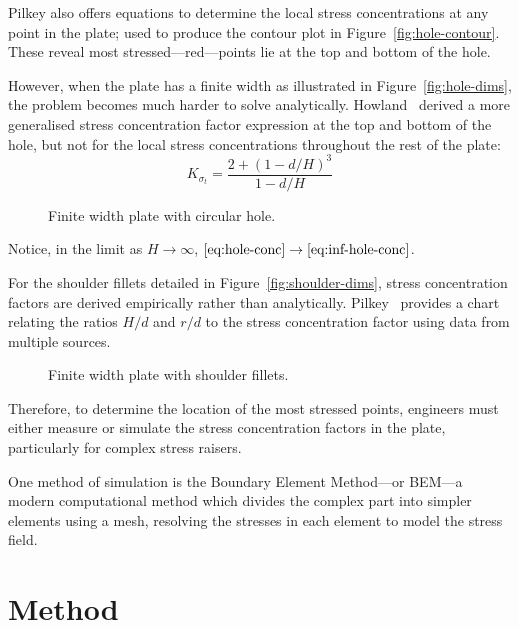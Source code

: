 \documentclass[a4paper,11pt,twocolumn]{article}
\newcommand{\BEM}{\textsc{BEM}\xspace}
\begin{document}
Pilkey also offers equations to determine the local stress concentrations at
any point in the plate; used to produce the contour plot in 
Figure~\ref{fig:hole-contour}. These reveal most stressed---red---points lie
at the top and bottom of the hole.

However, when the plate has a finite width as illustrated in 
Figure~\vref{fig:hole-dims}, the problem becomes much harder to solve
analytically. Howland~\cite{howland1930stresses} derived a more generalised 
stress concentration factor expression at the top and bottom of the hole, but
not for the local stress concentrations throughout the rest of the plate:
\begin{equation} \label{eq:hole-conc}
    K_{\sigma_t} = \frac{2 + (1 - d/H)^3}{1 - d/H}
\end{equation}

\begin{figure}[h]
    \centering
    \def\svgwidth{\linewidth}
    
    \caption{Finite width plate with circular hole.}
    \label{fig:hole-dims}
\end{figure}

Notice, in the limit as $H\rightarrow\infty$,
$\eqref{eq:hole-conc}\rightarrow\eqref{eq:inf-hole-conc}$.

For the shoulder fillets detailed in Figure~\vref{fig:shoulder-dims}, stress
concentration factors are derived empirically rather than analytically.
\mbox{Pilkey~\cite[p.~151]{pilkey2008peterson}} provides a chart relating the
ratios $H/d$ and $r/d$ to the stress concentration factor using data from
multiple sources.

\begin{figure}[h]
    \centering
    \def\svgwidth{\linewidth}
    
    \caption{Finite width plate with shoulder fillets.}
    \label{fig:shoulder-dims}
\end{figure}

Therefore, to determine the location of the most stressed points, engineers must
either measure or simulate the stress concentration factors in the plate,
particularly for complex stress raisers.

One method of simulation is the Boundary Element Method---or \BEM---a modern
computational method which divides the complex part into simpler elements using 
a mesh, resolving the stresses in each element to model the stress field.

\section{Method}
\end{document}
